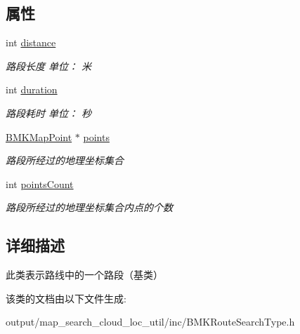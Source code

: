 \subsection*{属性}
\begin{DoxyCompactItemize}
\item 
\hypertarget{interface_b_m_k_route_step_a868b7ecc4313b1c1824a80199012c877}{int \hyperlink{interface_b_m_k_route_step_a868b7ecc4313b1c1824a80199012c877}{distance}}\label{interface_b_m_k_route_step_a868b7ecc4313b1c1824a80199012c877}

\begin{DoxyCompactList}\small\item\em 路段长度 单位： 米 \end{DoxyCompactList}\item 
\hypertarget{interface_b_m_k_route_step_a9c191d3389a169c46e76fb432926855d}{int \hyperlink{interface_b_m_k_route_step_a9c191d3389a169c46e76fb432926855d}{duration}}\label{interface_b_m_k_route_step_a9c191d3389a169c46e76fb432926855d}

\begin{DoxyCompactList}\small\item\em 路段耗时 单位： 秒 \end{DoxyCompactList}\item 
\hypertarget{interface_b_m_k_route_step_aa2faec42865f6254da77039a0729bb6b}{\hyperlink{struct_b_m_k_map_point}{B\+M\+K\+Map\+Point} $\ast$ \hyperlink{interface_b_m_k_route_step_aa2faec42865f6254da77039a0729bb6b}{points}}\label{interface_b_m_k_route_step_aa2faec42865f6254da77039a0729bb6b}

\begin{DoxyCompactList}\small\item\em 路段所经过的地理坐标集合 \end{DoxyCompactList}\item 
\hypertarget{interface_b_m_k_route_step_a58902517ed7dc89918d9b4b9a02dbafa}{int \hyperlink{interface_b_m_k_route_step_a58902517ed7dc89918d9b4b9a02dbafa}{points\+Count}}\label{interface_b_m_k_route_step_a58902517ed7dc89918d9b4b9a02dbafa}

\begin{DoxyCompactList}\small\item\em 路段所经过的地理坐标集合内点的个数 \end{DoxyCompactList}\end{DoxyCompactItemize}


\subsection{详细描述}
此类表示路线中的一个路段（基类） 

该类的文档由以下文件生成\+:\begin{DoxyCompactItemize}
\item 
output/map\+\_\+search\+\_\+cloud\+\_\+loc\+\_\+util/inc/B\+M\+K\+Route\+Search\+Type.\+h\end{DoxyCompactItemize}
